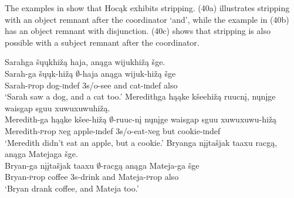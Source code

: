 \documentclass[output=paper]{LSP/langsci}
\begin{document}
\begin{exe}
\ex
{}
\end{exe}

The examples in  show that Hocąk exhibits stripping. (40a) illustrates stripping with an object remnant after the coordinator `and', while the example in (40b) has an object remnant with disjunction. (40c) shows that stripping is also possible with a subject remnant after the coordinator.

\begin{exe}
\ex
\begin{xlist}
\ex
\glll Sarahga šųųkhižą haja, anąga wijukhižą šge.\\
Sarah-ga šųųk-hižą $\emptyset$-haja anąga wijuk-hižą šge\\
Sarah-{\textsc prop} dog-{\textsc indef} {\textsc 3s/o}-see and cat-{\textsc indef} also\\
\trans `Sarah saw a dog, and a cat too.'
 \ex
\glll Meredithga hąąke kšeehižą ruucnį, nųnįge {waisgap sguu xuwuxuwuhižą}.\\
Meredith-ga hąąke kšee-hižą $\emptyset$-ruuc-nį nųnįge {waisgap sguu xuwuxuwu-hižą}\\
Meredith-{\textsc prop} {\textsc neg} apple-{\textsc indef} {\textsc 3s/o}-eat-{\textsc neg} but cookie-{\textsc indef}\\
\trans `Meredith didn't eat an apple, but a cookie.'
 \ex
\glll Bryanga {nįįtašjak taaxu} racgą, anąga Matejaga šge.\\
Bryan-ga {nįįtašjak taaxu} $\emptyset$-racgą anąga Mateja-ga šge\\
Bryan-{\textsc prop} coffee {\textsc 3s}-drink and Mateja-{\textsc prop} also\\
\trans `Bryan drank coffee, and Mateja too.'
\end{xlist}
\end{exe}
\end{document}
